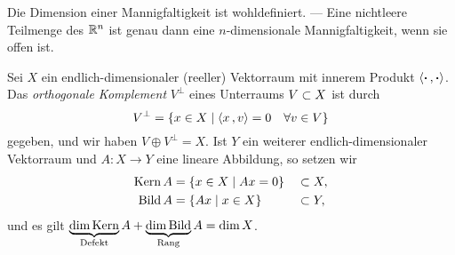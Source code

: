 \documentclass[skript.tex]{subfiles}
\begin{document}
	\begin{bem}
		Die Dimension einer Mannigfaltigkeit ist wohldefiniert. ---
		Eine nichtleere Teilmenge des $\mathbb{R}^n$ ist genau dann eine
		$n$-dimensionale Mannigfaltigkeit, wenn sie offen ist.
	\end{bem}
	
	\begin{notat}
		Sei $X$ ein endlich-dimensionaler (reeller) Vektorraum mit innerem Produkt $\langle \boldsymbol{\cdot}\,{,}\,\boldsymbol{\cdot} \rangle$.
		Das \emph{orthogonale Komplement} $V^\perp$ eines Unterraums $V \subset X$
		ist durch
		\[
			V^\perp = \{ x\in X \mid \langle x\,{,}\,v \rangle=0 \quad \forall v\in V\}
		\]
		gegeben, und wir haben $V \oplus V^\perp=X$.
		Ist $Y$ ein weiterer endlich-dimensionaler Vektorraum
		und $A \colon X \to Y$ eine lineare Abbildung, so setzen wir
		\begin{alignat*}{2}
			\operatorname{Kern} A &= \{x\in X \mid Ax=0\} &&\subset X, \\
			\operatorname{Bild} A &= \{Ax \mid x\in X\} &&\subset Y,
		\end{alignat*}
		und es gilt $\underbrace{\dim\operatorname{Kern}}_{\text{Defekt}} A + \underbrace{\dim\operatorname{Bild}}_{\text{Rang}} A = \dim X$.
	\end{notat}
\end{document}
